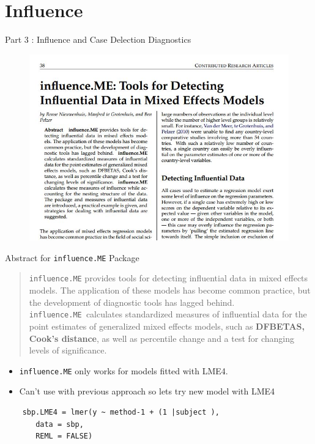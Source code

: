 \documentclass[compress]{beamer}        %
\begin{document}
		\section{Influence}
		\begin{frame}
			\huge
			Part 3 : Influence and Case Delection Diagnostics
		\end{frame}
		\begin{frame}
			\begin{figure}
\centering
\includegraphics[width=0.99\linewidth]{images/influenceME}

\end{figure}

		\end{frame}
		\begin{frame}Abstract for \texttt{influence.ME} Package
			\large\begin{quote}
\texttt{influence.ME} provides tools for detecting
influential data in mixed effects models.
The application of these models has become
common practice, but the development of diagnostic
tools has lagged behind. \\ \bigskip
\texttt{influence.ME
}calculates standardized measures of influential
data for the point estimates of generalized mixed
effects models, such as \textbf{DFBETAS, Cook's distance},
as well as percentile change and a test for
changing levels of significance. 
			\end{quote}
\end{frame}
\begin{frame}[fragile]
\large
\begin{itemize}
\item \texttt{influence.ME} only works for models fitted with LME4.
\item Can't use with previous approach so lets try new model with LME4
\end{itemize}
\begin{framed}
\begin{verbatim}
	sbp.LME4 = lmer(y ~ method-1 + (1 |subject ), 
	   data = sbp,
	   REML = FALSE)
\end{verbatim}
\end{framed}
\end{frame}
\end{document}
